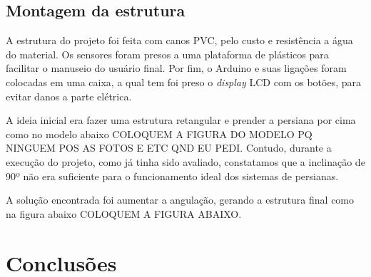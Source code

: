 \documentclass[a4paper,12pt]{report}
\begin{document}
\section{Montagem da estrutura}
	A estrutura do projeto foi feita com canos PVC, pelo custo e resistência a água do material. Os sensores foram presos a uma plataforma de plásticos para facilitar o manuseio do usuário final. Por fim, o Arduino e suas ligações foram colocadas em uma caixa, a qual tem foi preso o \textit{display} LCD com os botões, para evitar danos a parte elétrica.
	
	A ideia inicial era fazer uma estrutura retangular e prender a persiana por cima como no modelo abaixo COLOQUEM A FIGURA DO MODELO PQ NINGUEM POS AS FOTOS E ETC QND EU PEDI.
	Contudo, durante a execução do projeto, como já tinha sido avaliado, constatamos que a inclinação de 90º não era suficiente para o funcionamento ideal dos sistemas de persianas.
	
	A solução encontrada foi aumentar a angulação, gerando a estrutura final como na figura abaixo COLOQUEM A FIGURA ABAIXO.


\chapter{Conclusões}
	\label{cap:Conclusoes}

 
 

	
	
	
	
	
	
	
	
	
	
	
	
		
	
	
	
\end{document}
